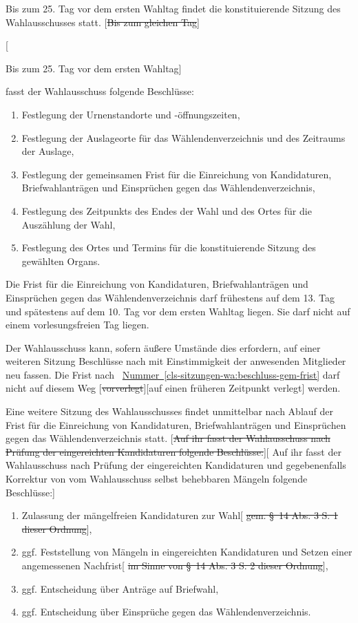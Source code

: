 \documentclass[%
draft,%
multilinesections%
]{fswo}
\newcommand\oldT[1]  {{\color{Gray}[\st{#1}]}}
\newcommand\newT[1]  {{\color{Green}[#1]}}
\newcommand\oldT[1]{}%
\newcommand\newT[1]{#1}
\newcommand\change[2]{\oldT{#1}\newT{#2}}
\newcommand*{\refItem}[1]{\hyperref[#1]{Nummer~\ref{#1}}}
\begin{document}
\begin{contract}
Bis zum 25. Tag vor dem ersten Wahltag findet die konstituierende Sitzung des Wahlausschusses statt.
\change{Bis zum gleichen Tag}{

Bis zum 25. Tag vor dem ersten Wahltag} fasst der Wahlausschuss folgende Beschlüsse:\label{cls-sitzungen-wa:abs-wichtige-beschluesse}
\begin{enumerate}
\item Festlegung der Urnenstandorte und -öffnungszeiten,
\item Festlegung der Auslageorte für das Wählendenverzeichnis und des Zeitraums der Auslage,
\item Festlegung der gemeinsamen Frist für die Einreichung von Kandidaturen, Briefwahlanträgen und Einsprüchen gegen das Wählendenverzeichnis,\label{cls-sitzungen-wa:beschluss-gem-frist}
\item Festlegung des Zeitpunkts des Endes der Wahl und des Ortes für die Auszählung der Wahl,
\item Festlegung des Ortes und Termins für die konstituierende Sitzung des gewählten Organs.
\end{enumerate}
Die Frist für die Einreichung von Kandidaturen, Briefwahlanträgen und Einsprüchen gegen das Wählendenverzeichnis darf frühestens auf dem 13. Tag und spätestens auf dem 10. Tag vor dem ersten Wahltag liegen.
Sie darf nicht auf einem vorlesungsfreien Tag liegen.


Der Wahlausschuss kann, sofern äußere Umstände dies erfordern, auf einer weiteren Sitzung Beschlüsse nach  mit Einstimmigkeit der anwesenden Mitglieder neu fassen.
Die Frist nach ~\refItem{cls-sitzungen-wa:beschluss-gem-frist} darf nicht auf diesem Weg \change{vorverlegt}{auf einen früheren Zeitpunkt verlegt} werden.

Eine weitere Sitzung des Wahlausschusses findet unmittelbar nach Ablauf der Frist für die Einreichung von Kandidaturen, Briefwahlanträgen und Einsprüchen gegen das Wählendenverzeichnis statt.
\change{Auf ihr fasst der Wahlausschuss nach Prüfung der eingereichten Kandidaturen folgende Beschlüsse:}{%
Auf ihr fasst der Wahlausschuss nach Prüfung der eingereichten Kandidaturen und gegebenenfalls Korrektur von vom Wahlausschuss selbst behebbaren Mängeln folgende Beschlüsse:}
\begin{enumerate}
\item Zulassung der mängelfreien Kandidaturen zur Wahl\oldT{ gem. \S~14 Abs. 3 S. 1 dieser Ordnung},
\item ggf. Feststellung von Mängeln in eingereichten Kandidaturen und Setzen einer angemessenen Nachfrist\label{cls-sitzungen-wa:nachfrist}\oldT{ im Sinne von \S~14 Abs. 3 S. 2 dieser Ordnung},
\item ggf. Entscheidung über Anträge auf Briefwahl,
\item ggf. Entscheidung über Einsprüche gegen das Wählendenverzeichnis.
\end{enumerate}
\label{cls-sitzungen-wa:abs-beschluesse-fristende}


\end{contract}
\end{document}
